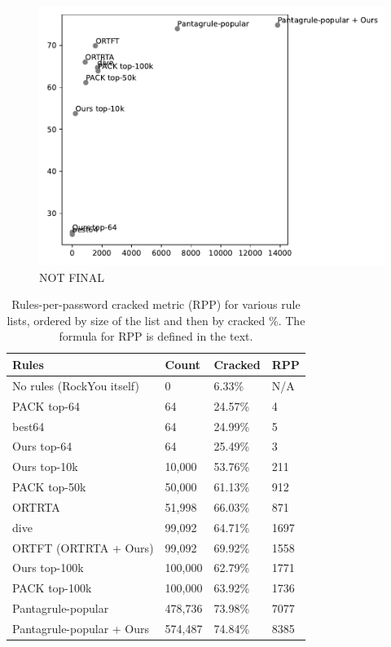 \documentclass[letterpaper,twocolumn,10pt]{article}
\begin{document}
\begin{figure}[h]
    \includegraphics[width=\linewidth]
{../cracked_attempted_rpp_plot_34c2c5e0-a799-11ed-8056-005056c00001.pdf}
    \caption{NOT FINAL}
    \label{fig:rpp}
\end{figure}

\begin{table}
\centering
\begin{tabular}{|l|l|l|l|}
  \hline
  Rules & Count & Cracked & RPP \\
  \hline
  No rules (RockYou itself) & 0 & 6.33\% & N/A \\
  PACK top-64 & 64 & 24.57\% & 4 \\
  best64 & 64 & 24.99\% & 5 \\
  Ours top-64 & 64 & 25.49\% & 3 \\
  Ours top-10k & 10,000 & 53.76\% & 211 \\
  PACK top-50k & 50,000 & 61.13\% & 912 \\
  ORTRTA & 51,998 & 66.03\% & 871 \\
  dive & 99,092 & 64.71\% & 1697 \\
  ORTFT (ORTRTA + Ours) & 99,092 & 69.92\% & 1558 \\
  Ours top-100k & 100,000 & 62.79\% & 1771 \\
  PACK top-100k & 100,000 & 63.92\% & 1736 \\
  Pantagrule-popular & 478,736 & 73.98\% & 7077 \\
  Pantagrule-popular + Ours & 574,487 & 74.84\% & 8385 \\
  \hline
\end{tabular}
\caption{Rules-per-password cracked metric (RPP) for various rule lists, ordered
by size of the list and then by cracked \%. The formula for RPP is defined in
the text.}
\label{tab:rpp}
\end{table}
\end{document}

